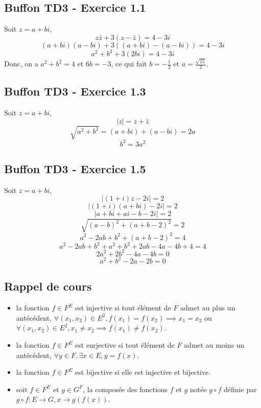\documentclass[]{book}
\theoremstyle{definition}
\begin{document}
\newpage
\subsection*{Buffon TD3 - Exercice 1.1}
Soit $z=a+bi$,
$$z\bar{z} + 3(z-\bar{z}) = 4 -3i$$
$$(a+bi)(a-bi) + 3((a+bi)-(a-bi)) = 4 -3i$$
$$ a^2+b^2 + 3(2bi) = 4 -3i$$
Donc, on a $a^2+b^2 =4$ et $6b = -3$, ce qui fait $b=-\frac{1}{2}$ et $a=\frac{\sqrt{15}}{2}$.

\subsection*{Buffon TD3 - Exercice 1.3}
Soit $z=a+bi$,
$$|z| = z + \bar{z}$$
$$\sqrt{a^2+b^2} = (a+bi)+(a-bi) = 2a$$
$$b^2 = 3a^2$$

\subsection*{Buffon TD3 - Exercice 1.5}
Soit $z=a+bi$,
$$|(1+i)z-2i| = 2$$
$$|(1+i)(a+bi)-2i| = 2$$
$$|a+bi+ai-b-2i| = 2$$
$$\sqrt{(a-b)^2+(a+b-2)^2} = 2$$
$$a^2-2ab+b^2 +(a+b-2)^2 = 4$$
$$a^2-2ab+b^2 + a^2+b^2+2ab-4a-4b+4 = 4$$
$$2a^2+2b^2 -4a-4b = 0$$
$$a^2+b^2 -2a-2b = 0$$


\newpage
\subsection*{Rappel de cours}	
\begin{itemize}
\item la fonction $f \in F^{E}$ est injective si tout \'el\'ement de $F$ admet au plus un ant\'ec\'edent, $\forall (x_1, x_2) \in E^2, f(x_1) = f(x_2) \implies x_1 = x_2$ ou $\forall (x_1, x_2) \in E^2, x_1 \neq x_2 \implies f(x_1) \neq f(x_2)$.
\item la fonction $f \in F^{E}$ est surjective si tout \'el\'ement de $F$ admet au moins un ant\'ec\'edent, $\forall y \in F, \exists x \in E, y = f(x)$.
\item la fonction $f \in F^{E}$ est bijective si elle est injective et bijective.
\item soit $f \in F^{E}$ et $g \in G^{F}$, la compos\'ee des fonctions $f$ et $g$ not\'ee $g \circ f$ d\'efinie par $g \circ f : E \to G, x \to g(f(x))$.
\end{itemize}
\end{document}
